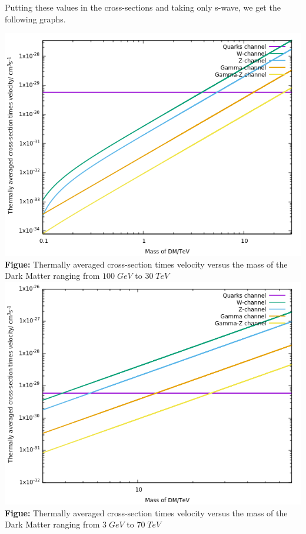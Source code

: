 \documentclass[12pt]{report}
\begin{document}
 Putting these values in the cross-sections and taking only s-wave, we get the following graphs. 

\begin{center}

\includegraphics[scale=0.6]{CR1.png}\\
\textbf{Figue:} Thermally averaged cross-section times velocity versus the mass of the Dark Matter ranging from $100\; GeV$ to $30\; TeV$ 
\includegraphics[scale=0.6]{CR2.png}\\
\textbf{Figue:} Thermally averaged cross-section times velocity versus the mass of the Dark Matter ranging from $3\; GeV$ to $70\; TeV$ 
\end{center}
\end{document}
